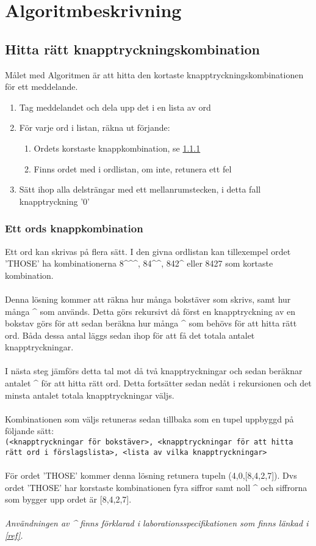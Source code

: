 \documentclass[a4paper]{article}
\def\code#1{\texttt{#1}}
\begin{document}
\section{Algoritmbeskrivning}
\subsection{Hitta rätt knapptryckningskombination}
Målet med Algoritmen är att hitta den kortaste knapptryckningskombinationen för ett meddelande.
\begin{enumerate}
	\item Tag meddelandet och dela upp det i en lista av ord
	\item För varje ord i listan, räkna ut förjande:
	\begin{enumerate}
		\item Ordets korstaste knappkombination, se \ref{eok}
		\item Finns ordet med i ordlistan, om inte, retunera ett fel
	\end{enumerate}
	\item Sätt ihop alla delsträngar med ett mellanrumstecken, i detta fall knapptryckning '0'
\end{enumerate}
\subsubsection{Ett ords knappkombination}\label{eok}
Ett ord kan skrivas på flera sätt. I den givna ordlistan kan tillexempel ordet 'THOSE' ha kombinationerna 8\^{}\^{}\^{}, 84\^{}\^{}, 842\^{} eller 8427 som kortaste kombination. \\ \\
Denna lösning kommer att räkna hur många bokstäver som skrivs, samt hur många \^{} som används. Detta görs rekursivt då först en knapptryckning av en bokstav görs för att sedan beräkna hur många \^{} som behövs för att hitta rätt ord. Båda dessa antal läggs sedan ihop för att få det totala antalet knapptryckningar. \\ \\ 
I nästa steg jämförs detta tal mot då två knapptryckningar och sedan beräknar antalet \^{} för att hitta rätt ord. Detta fortsätter sedan nedåt i rekursionen och det minsta antalet totala knapptryckningar väljs.\\ \\
Kombinationen som väljs retuneras sedan tillbaka som en tupel uppbyggd på följande sätt: \\
\code{(<knapptryckningar för bokstäver>, <knapptryckningar för att hitta rätt ord i förslagslista>, <lista av vilka knapptryckningar>}
\\ \\  För ordet 'THOSE' kommer denna lösning retunera tupeln (4,0,[8,4,2,7]). Dvs ordet 'THOSE' har korstaste kombinationen fyra siffror samt noll \^{} och siffrorna som bygger upp ordet är [8,4,2,7].
\\ \\ \textit{Användningen av \^{} finns förklarad i laborationsspecifikationen som finns länkad i \ref{ref}.}
\end{document}
